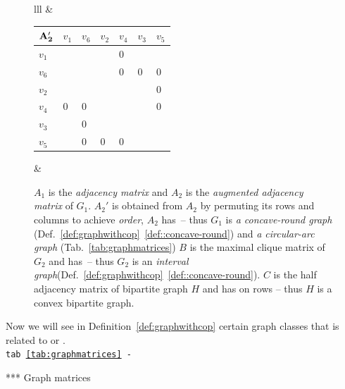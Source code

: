 \begin{figure}[t]
\begin{tabular}{lll}
    &
    \begin{tabular}[h]{l|llllll}
      ${\bf A_2'}$ &$v_1$ &$v_6$ &$v_2$ &$v_4$ &$v_3$ &$v_5$\\
      \hline
      $v_1$ &\un   &\un   &\un  &0     &\un   &\un \\
      $v_6$ &\un   &\un   &\un  &0     &0     &0   \\
      $v_2$ &\un   &\un   &\un  &\un   &\un   &0   \\
      $v_4$ &0     &0     &\un  &\un   &\un   &0   \\
      $v_3$ &\un   &0     &\un  &\un   &\un   &\un \\
      $v_5$ &\un   &0     &0    &0     &\un   &\un 
    \end{tabular}
   & \\


  \end{tabular}

  

  \caption[\figtabsize Matrices defined in
  Def.~\ref{def:graphmatrices}]{\figtabsize $A_1$ is the
    {\em adjacency matrix} and $A_2$ is the {\em augmented adjacency matrix} of
    $G_1$. $A_2'$ is obtained from $A_2$ by permuting its rows
    and columns to achieve {\em \CROP order}, \ie $A_2$ has
    \CROP\,-- thus $G_1$
    is {\em a concave-round graph} (Def.~\ref{def:graphwithcop}~\ref{def::concave-round})
    and {\em a circular-arc graph} (Tab.~\ref{tab:graphmatrices})
    $B$ is the maximal clique matrix of $G_2$ and has \COP\,-- thus $G_2$ is an
    {\em interval graph}(Def.~\ref{def:graphwithcop}~\ref{def::concave-round}). $C$ is
    the half adjacency matrix of bipartite graph $H$ and has \COP on
    rows -- thus $H$ is {a convex bipartite graph}.} 
  \label{fig:graphmatrices}
\end{figure}


Now we will see in Definition~\ref{def:graphwithcop} certain graph
classes that is related to \COP or \CROP.\\

{\tt tab~\ref{tab:graphmatrices} -}   

\begin{table}[htbp]
  \centering
 \caption{\figtabsize **** Graph matrices}
  \label{tab:graphmatrices}
\end{table}

